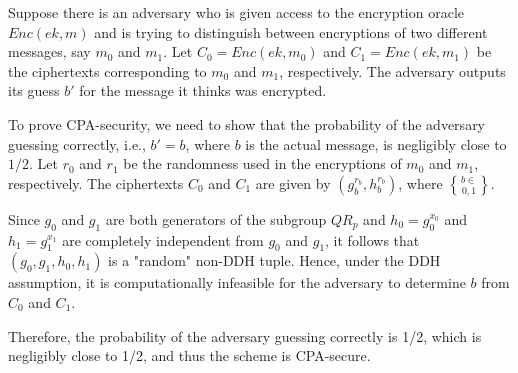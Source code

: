 \begin{itemize}
        Suppose there is an adversary who is given access to the encryption oracle $Enc(ek, m)$
         and is trying to distinguish between encryptions of two different messages, say $m_0$ and $m_1$. 
         Let $C_0 = Enc(ek, m_0)$ and $C_1 = Enc(ek, m_1)$ be the ciphertexts corresponding to $m_0$ and $m_1$, respectively. 
         The adversary outputs its guess $b'$ for the message it thinks was encrypted.
        
         
        To prove CPA-security, we need to show that the probability of the adversary guessing correctly,
         i.e., $b' = b$, where $b$ is the actual message, is negligibly close to $1/2$. 
         Let $r_0$ and $r_1$ be the randomness used in the encryptions of $m_0$ and $m_1$, respectively. 
         The ciphertexts $C_0$ and $C_1$ are given by $(g_b^{r_b}, h_b^{r_b})$, where $b \in \brace{0, 1}$.
        
        Since $g_0$ and $g_1$ are both generators of the subgroup $QR_p$ and $h_0 = g_0^{x_0}$ and $h_1 = g_1^{x_1}$
         are completely independent from $g_0$ and $g_1$, it follows that $(g_0, g_1, h_0, h_1)$ is a "random" non-DDH tuple.
          Hence, under the DDH assumption, it is computationally infeasible for the adversary to determine $b$ from $C_0$ and $C_1$.
        
        Therefore, the probability of the adversary guessing correctly is 1/2, which is negligibly close to 1/2, and thus the scheme is CPA-secure.
        
\end{itemize}
